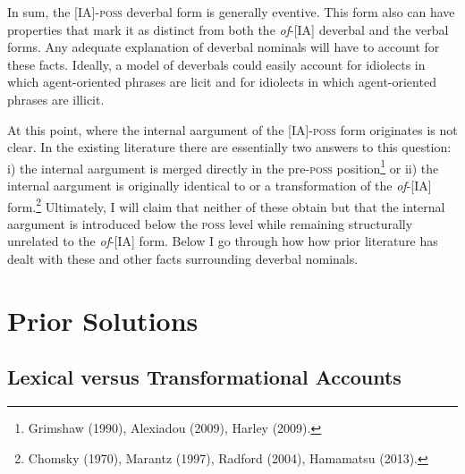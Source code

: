 \documentclass[12pt]{article}
\begin{document}
\doublespacing

In sum, the [IA]-\textsc{poss} deverbal form is generally eventive. This form also can have properties that mark it as distinct from both the \textit{of}-[IA] deverbal and the verbal forms. Any adequate explanation of deverbal nominals will have to account for these facts. Ideally, a model of deverbals could easily account for idiolects in which agent-oriented phrases are licit and for idiolects in which agent-oriented phrases are illicit.

At this point, where the internal aargument of the [IA]-\textsc{poss} form originates is not clear. In the existing literature there are essentially two answers to this question: i) the internal aargument is merged directly in the pre-\textsc{poss} position\footnote{ Grimshaw (1990), Alexiadou (2009), Harley (2009).} or ii) the internal aargument is originally identical to or a transformation of the \textit{of}-[IA] form.\footnote{ Chomsky (1970), Marantz (1997), Radford (2004), Hamamatsu (2013).} Ultimately, I will claim that neither of these obtain but that the internal aargument is introduced below the \textsc{poss} level while remaining structurally unrelated to the \textit{of}-[IA] form. Below I go through how how prior literature has dealt with these and other facts surrounding deverbal nominals.

\section{Prior Solutions}\label{priors}

\subsection{Lexical versus Transformational Accounts}\label{priors1}
\end{document}
